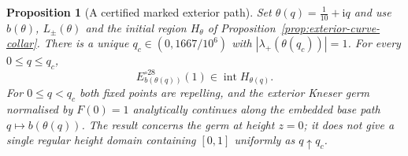 \documentclass[11pt,a4paper]{article}
\newtheorem{proposition}[theorem]{Proposition}
\theoremstyle{definition}
\newcommand{\ii}{\mathrm{i}}
\begin{document}
\begin{proposition}[A certified marked exterior path]
\label{prop:exterior-marked-path}
Set $\theta(q)=\frac1{10}+\ii q$ and use $b(\theta)$, $L_\pm(\theta)$
and the initial region $H_\theta$ of
Proposition~\ref{prop:exterior-curve-collar}.  There is a unique
$q_c\in(0,1667/10^6)$ with
$|\lambda_+(\theta(q_c))|=1$.  For every $0\le q\le q_c$,
\[
 E_{b(\theta(q))}^{\circ28}(1)\in\operatorname{int}H_{\theta(q)}.
\]
For $0\le q<q_c$ both fixed points are repelling, and the exterior
Kneser germ normalised by $F(0)=1$ analytically continues along the
embedded base path $q\mapsto b(\theta(q))$.  The result concerns the
germ at height $z=0$; it does not give a single regular height domain
containing $[0,1]$ uniformly as $q\uparrow q_c$.
\end{proposition}
\end{document}
